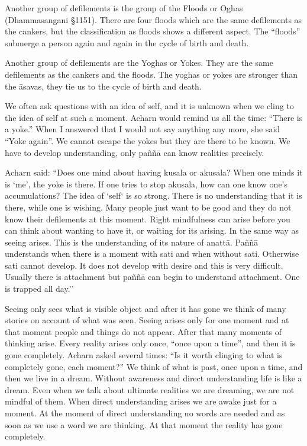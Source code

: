 Another group of defilements is the group of the Floods or Oghas
(Dhammasangani §1151). There are four floods which are the same
defilements as the cankers, but the classification as floods shows a
different aspect. The ``floods'' submerge a person again and again in
the cycle of birth and death.

Another group of defilements are the Yoghas or Yokes. They are the same
defilements as the cankers and the floods. The yoghas or yokes are
stronger than the āsavas, they tie us to the cycle of birth and death.

We often ask questions with an idea of self, and it is unknown when we
cling to the idea of self at such a moment. Acharn would remind us all
the time: ``There is a yoke.'' When I answered that I would not say
anything any more, she said ``Yoke again''. We cannot escape the yokes
but they are there to be known. We have to develop understanding, only
paññā can know realities precisely.

Acharn said: ``Does one mind about having kusala or akusala? When one
minds it is `me', the yoke is there. If one tries to stop akusala, how
can one know one's accumulations? The idea of `self` is so strong. There
is no understanding that it is there, while one is wishing. Many people
just want to be good and they do not know their defilements at this
moment. Right mindfulness can arise before you can think about wanting
to have it, or waiting for its arising. In the same way as seeing
arises. This is the understanding of its nature of anattā. Paññā
understands when there is a moment with sati and when without sati.
Otherwise sati cannot develop. It does not develop with desire and this
is very difficult. Usually there is attachment but paññā can begin to
understand attachment. One is trapped all day.''

Seeing only sees what is visible object and after it has gone we think
of many stories on account of what was seen. Seeing arises only for one
moment and at that moment people and things do not appear. After that
many moments of thinking arise. Every reality arises only once, ``once
upon a time'', and then it is gone completely. Acharn asked several
times: ``Is it worth clinging to what is completely gone, each moment?''
We think of what is past, once upon a time, and then we live in a dream.
Without awareness and direct understanding life is like a dream. Even
when we talk about ultimate realities we are dreaming, we are not
mindful of them. When direct understanding arises we are awake just for
a moment. At the moment of direct understanding no words are needed and
as soon as we use a word we are thinking. At that moment the reality has
gone completely.

